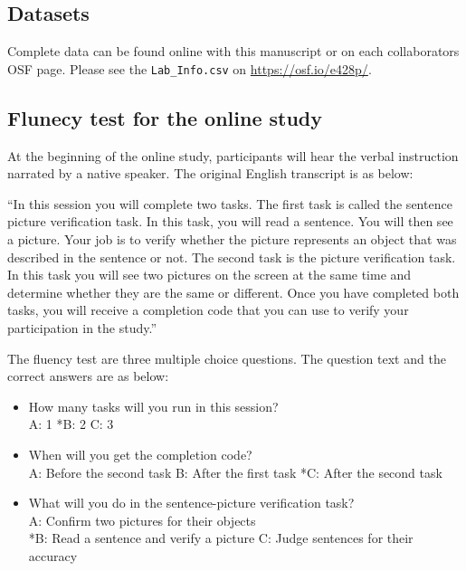 \documentclass[
  man,mask,floatsintext]{apa7}
\begin{document}
\hypertarget{datasets}{%
\subsection{Datasets}\label{datasets}}

Complete data can be found online with this manuscript or on each collaborators OSF page. Please see the \texttt{Lab\_Info.csv} on \url{https://osf.io/e428p/}.

\hypertarget{flunecy-test-for-the-online-study}{%
\subsection{Flunecy test for the online study}\label{flunecy-test-for-the-online-study}}

At the beginning of the online study, participants will hear the verbal instruction narrated by a native speaker. The original English transcript is as below:

``In this session you will complete two tasks. The first task is called the sentence picture verification task. In this task, you will read a sentence. You will then see a picture. Your job is to verify whether the picture represents an object that was described in the sentence or not. The second task is the picture verification task. In this task you will see two pictures on the screen at the same time and determine whether they are the same or different. Once you have completed both tasks, you will receive a completion code that you can use to verify your participation in the study.''

The fluency test are three multiple choice questions. The question text and the correct answers are as below:

\begin{itemize}
\item
  How many tasks will you run in this session?\\
  A: 1
  *B: 2
  C: 3
\item
  When will you get the completion code?\\
  A: Before the second task
  B: After the first task
  *C: After the second task
\item
  What will you do in the sentence-picture verification task?\\
  A: Confirm two pictures for their objects\\
  *B: Read a sentence and verify a picture
  C: Judge sentences for their accuracy
\end{itemize}
\end{document}
